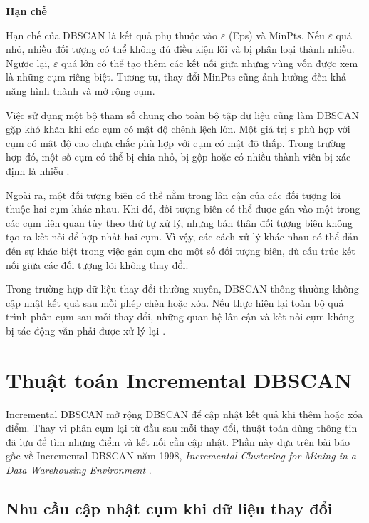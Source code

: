 \textbf{Hạn chế}

Hạn chế của DBSCAN là kết quả phụ thuộc vào \(\varepsilon\) (Eps) và \(\mathrm{MinPts}\). Nếu \(\varepsilon\) quá nhỏ, nhiều đối tượng có thể không đủ điều kiện lõi và bị phân loại thành nhiễu. Ngược lại, \(\varepsilon\) quá lớn có thể tạo thêm các kết nối giữa những vùng vốn được xem là những cụm riêng biệt. Tương tự, thay đổi \(\mathrm{MinPts}\) cũng ảnh hưởng đến khả năng hình thành và mở rộng cụm.

Việc sử dụng một bộ tham số chung cho toàn bộ tập dữ liệu cũng làm DBSCAN gặp khó khăn khi các cụm có mật độ chênh lệch lớn. Một giá trị \(\varepsilon\) phù hợp với cụm có mật độ cao chưa chắc phù hợp với cụm có mật độ thấp. Trong trường hợp đó, một số cụm có thể bị chia nhỏ, bị gộp hoặc có nhiều thành viên bị xác định là nhiễu \parencite{ester1996dbscan}.

Ngoài ra, một đối tượng biên có thể nằm trong lân cận của các đối tượng lõi thuộc hai cụm khác nhau. Khi đó, đối tượng biên có thể được gán vào một trong các cụm liên quan tùy theo thứ tự xử lý, nhưng bản thân đối tượng biên không tạo ra kết nối để hợp nhất hai cụm. Vì vậy, các cách xử lý khác nhau có thể dẫn đến sự khác biệt trong việc gán cụm cho một số đối tượng biên, dù cấu trúc kết nối giữa các đối tượng lõi không thay đổi.

Trong trường hợp dữ liệu thay đổi thường xuyên, DBSCAN thông thường không cập nhật kết quả sau mỗi phép chèn hoặc xóa. Nếu thực hiện lại toàn bộ quá trình phân cụm sau mỗi thay đổi, những quan hệ lân cận và kết nối cụm không bị tác động vẫn phải được xử lý lại \parencite{ester1998incrementaldbscan}.

\section{Thuật toán Incremental DBSCAN}

Incremental DBSCAN mở rộng DBSCAN để cập nhật kết quả khi thêm hoặc xóa điểm. Thay vì phân cụm lại từ đầu sau mỗi thay đổi, thuật toán dùng thông tin đã lưu để tìm những điểm và kết nối cần cập nhật. Phần này dựa trên bài báo gốc về Incremental DBSCAN năm 1998, \textit{Incremental Clustering for Mining in a Data Warehousing Environment} \parencite{ester1998incrementaldbscan}.

\subsection{Nhu cầu cập nhật cụm khi dữ liệu thay đổi}

